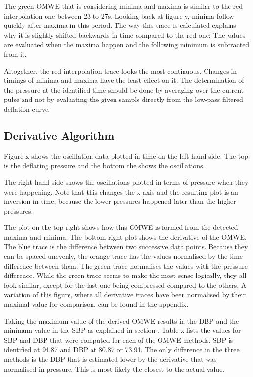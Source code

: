 The green OMWE that is considering minima and maxima is similar to the red interpolation one between 23 to 27s. Looking back at figure y, minima follow quickly after maxima in this period. The way this trace is calculated explains why it is slightly shifted backwards in time compared to the red one: The values are evaluated when the maxima happen and the following minimum is subtracted from it. 

Altogether, the red interpolation trace looks the most continuous. Changes in timings of minima and maxima have the least effect on it. The determination of the pressure at the identified time should be done by averaging over the current pulse and not by evaluating the given sample directly from the low-pass filtered deflation curve.

\subsection{Derivative Algorithm}\label{sec:pyder}

Figure x shows the oscillation data plotted in time on the left-hand side. The top is the deflating pressure and the bottom the shows the oscillations. 

The right-hand side shows the oscillations plotted in terms of pressure when they were happening. Note that this changes the x-axis and the resulting plot is an inversion in time, because the lower pressures happened later than the higher pressures. 

The plot on the top right shows how this OMWE is formed from the detected maxima and minima. The bottom-right plot shows the derivative of the OMWE. The blue trace is the difference between two successive data points. Because they can be spaced unevenly, the orange trace has the values normalised by the time difference between them. The green trace normalises the values with the pressure difference. While the green trace seems to make the most sense logically, they all look similar, except for the last one being compressed compared to the others. A variation of this figure, where all derivative traces have been normalised by their maximal value for comparison, can be found in the appendix.

Taking the maximum value of the derived OMWE results in the DBP and the minimum value in the SBP as explained in section .
Table x lists the values for SBP and DBP that were computed for each of the OMWE methods. SBP is identified at 94.87 and DBP at 80.87 or 73.94. The only difference in the three methods is the DBP that is estimated lower by the derivative that was normalised in pressure. This is most likely the closest to the actual value.

